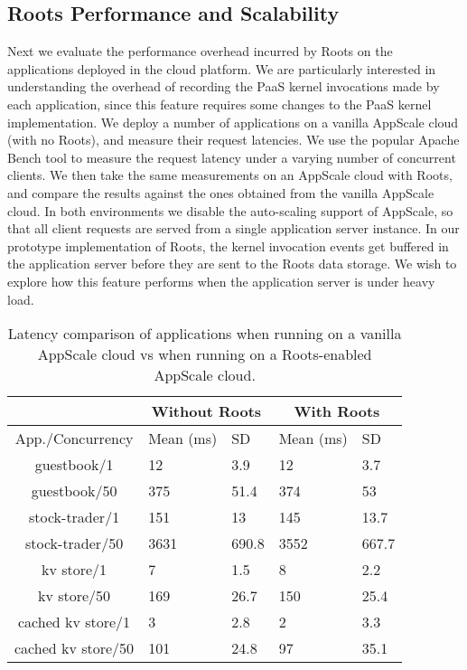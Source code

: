 \subsection{Roots Performance and Scalability}
Next we evaluate the performance overhead incurred by Roots on the applications deployed in the 
cloud platform. We are particularly interested in understanding the overhead of recording the PaaS kernel
invocations made by each application, since this feature requires some changes to the PaaS kernel
implementation. 
We deploy a number of applications on a vanilla
AppScale cloud (with no Roots), and measure their request latencies. We use
the popular Apache Bench tool to measure the request latency under a
varying number of concurrent clients. We then take the same measurements
on an AppScale cloud with Roots, and compare the results against the ones obtained
from the vanilla AppScale cloud. In both environments we disable the auto-scaling
support of AppScale, so that all client requests are served from a single application
server instance. In our prototype implementation of Roots, the kernel invocation events get buffered in
the application server before they are sent to the Roots data storage. We wish to
explore how this feature performs when the application server is under heavy load.

\begin{table}
\begin{center}
\begin{tabular}{|c|p{0.8cm}|p{0.8cm}|p{0.8cm}|p{0.8cm}|}
\hline &
      \multicolumn{2}{c|}{Without Roots} &
      \multicolumn{2}{c|}{With Roots} \\ \hline
    App./Concurrency & Mean (ms) & SD & Mean (ms) & SD\\

\hline
guestbook/1 & 12 & 3.9 & 12 & 3.7 \\ \hline
guestbook/50 & 375 & 51.4 & 374 & 53 \\ \hline
stock-trader/1 & 151 & 13 & 145 & 13.7 \\ \hline
stock-trader/50 & 3631 & 690.8 & 3552 & 667.7 \\ \hline
kv store/1 & 7 & 1.5 & 8 & 2.2 \\ \hline
kv store/50 & 169 & 26.7  & 150 & 25.4  \\ \hline
cached kv store/1 & 3 & 2.8 & 2 & 3.3 \\ \hline
cached kv store/50 & 101 & 24.8 & 97 & 35.1  \\ \hline
\end{tabular}
\end{center}
\caption{Latency comparison of applications when running on
a vanilla AppScale cloud vs when running on a Roots-enabled
AppScale cloud.
\label{tab:perf_overhead}
}
\end{table}


